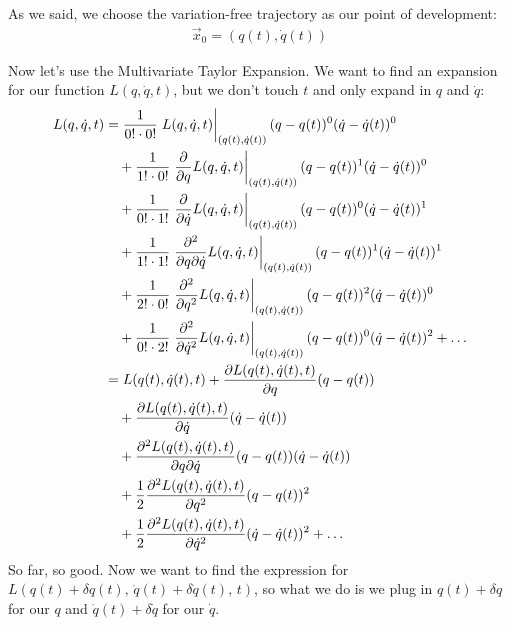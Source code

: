     As we said, we choose the variation-free trajectory as our point of development: 
    \begin{align}
    \vec{x}_0=(q(t), \dot{q}(t)) 
\end{align}

Now let's use the Multivariate Taylor Expansion. We want to find an expansion for our function $L(q,\dot{q},t)$, but we don't touch $t$ and only expand in $q$ and $\dot{q}$:
\begin{align*}
    L(q, \dot{q}, t) &= \frac{1}{0!\cdot 0!}\eval{L(q, \dot{q}, t)}_{(q(t), \dot{q}(t))}(q-q(t))^0(\dot{q}-\dot{q}(t))^0 \\
    &\quad + \frac{1}{1!\cdot 0!}\eval{\frac{\partial}{\partial q}L(q, \dot{q}, t)}_{(q(t), \dot{q}(t))}(q-q(t))^1(\dot{q}-\dot{q}(t))^0 \\
    &\quad + \frac{1}{0!\cdot 1!}\eval{\frac{\partial}{\partial \dot{q}}L(q, \dot{q}, t)}_{(q(t), \dot{q}(t))}(q-q(t))^0(\dot{q}-\dot{q}(t))^1 \\
    &\quad + \frac{1}{1!\cdot 1!}\eval{\frac{\partial^2}{\partial q\partial\dot{q}}L(q, \dot{q}, t)}_{(q(t), \dot{q}(t))}(q-q(t))^1(\dot{q}-\dot{q}(t))^1 \\
    &\quad + \frac{1}{2!\cdot 0!}\eval{\frac{\partial^2}{\partial q^2}L(q, \dot{q}, t)}_{(q(t), \dot{q}(t))}(q-q(t))^2(\dot{q}-\dot{q}(t))^0 \\
    &\quad + \frac{1}{0!\cdot 2!}\eval{\frac{\partial^2}{\partial \dot{q}^2}L(q, \dot{q}, t)}_{(q(t), \dot{q}(t))}(q-q(t))^0(\dot{q}-\dot{q}(t))^2+\dots \\
    &=L(q(t),\dot{q}(t),t)+\frac{\partial L(q(t),\dot{q}(t), t)}{\partial q}(q-q(t)) \\
    &\quad + \frac{\partial L(q(t),\dot{q}(t), t)}{\partial \dot{q}}(\dot{q}-\dot{q}(t)) \\
    &\quad + \frac{\partial^2 L(q(t),\dot{q}(t), t)}{\partial q \partial \dot{q}}(q-q(t))(\dot{q}-\dot{q}(t)) \\
    &\quad + \frac{1}{2}\frac{\partial^2 L(q(t),\dot{q}(t), t)}{\partial q^2}(q-q(t))^2 \\
    &\quad + \frac{1}{2}\frac{\partial^2 L(q(t),\dot{q}(t), t)}{\partial \dot{q}^2}(\dot{q}-\dot{q}(t))^2+\dots
\end{align*}
So far, so good. Now we want to find the expression for $L(q(t)+\delta q(t),\,\dot{q}(t)+\delta \dot{q}(t),\, t)$, so what we do is we plug in $q(t)+\delta q$ for our $q$ and $\dot{q}(t)+\delta \dot{q}$ for our $\dot{q}$. 
